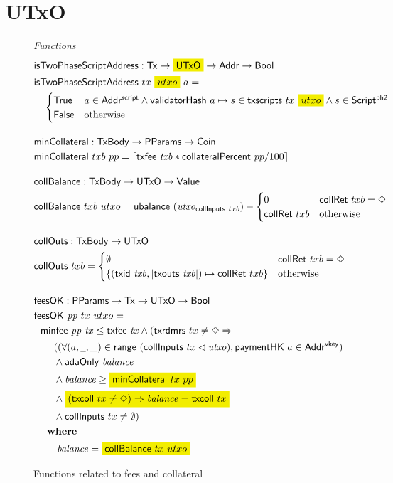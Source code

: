 \section{UTxO}
\label{sec:utxo}

\begin{figure*}[htb]
  \emph{Functions}
  \begin{align*}
    & \fun{isTwoPhaseScriptAddress} : \Tx \to \hldiff{\UTxO} \to \Addr \to \Bool \\
    & \fun{isTwoPhaseScriptAddress}~tx~\hldiff{utxo}~a = \\
    &\quad\begin{cases}
        \True  & a \in \AddrScr \land \fun{validatorHash}~a \mapsto s \in \fun{txscripts}~tx~\hldiff{utxo} \land s \in \ScriptPhTwo \\
        \False & \text{otherwise}
      \end{cases}
    \nextdef
    & \fun{minCollateral} : \TxBody \to \PParams \to \Coin \\
    & \fun{minCollateral}~txb~pp = \lceil \txfee{txb} * \fun{collateralPercent}~pp / 100 \rceil
    \nextdef
    & \fun{collBalance} : \TxBody \to \UTxO \to \Value \\
    & \fun{collBalance}~txb~utxo = \fun{ubalance}~(\var{utxo}_{\fun{collInputs}~{txb}}) -
      \begin{cases}
         0                 & \fun{collRet}~txb = \Nothing \\
         \fun{collRet}~txb & \text{otherwise}
      \end{cases}
    \nextdef
    & \fun{collOuts} : \TxBody \to \UTxO \\
    & \fun{collOuts}~txb =
      \begin{cases}
        \emptyset                                                      & \fun{collRet}~txb = \Nothing \\
        \{ (\txid{txb}, | \txouts{txb} |) \mapsto \fun{collRet}~txb \} & \text{otherwise}
      \end{cases}
    \nextdef
    & \fun{feesOK} : \PParams \to \Tx \to \UTxO \to \Bool  \\
    & \fun{feesOK}~\var{pp}~tx~utxo = \\
    &~~      \minfee{pp}{tx} \leq \txfee{tx} \wedge (\fun{txrdmrs}~tx \neq \Nothing \Rightarrow \\
    &~~~~~~((\forall (a, \wcard, \_) \in \fun{range}~(\fun{collInputs}~tx \restrictdom \var{utxo}), \fun{paymentHK}~a \in \AddrVKey) \\
    &~~~~~~\wedge \fun{adaOnly}~\var{balance} \\
    &~~~~~~\wedge \var{balance} \geq \hldiff{\fun{minCollateral}~tx~pp} \\
    &~~~~~~\wedge \hldiff{(\fun{txcoll}~tx \neq \Nothing) \Rightarrow \var{balance} = \fun{txcoll}~tx} \\
    &~~~~~~\wedge \fun{collInputs}~{tx} \neq \emptyset) \\
    &~~      \where \\
    & ~~~~~~~ \var{balance}=\hldiff{\fun{collBalance}~tx~utxo}
  \end{align*}
  \caption{Functions related to fees and collateral}
  \label{fig:functions:utxo}
\end{figure*}
